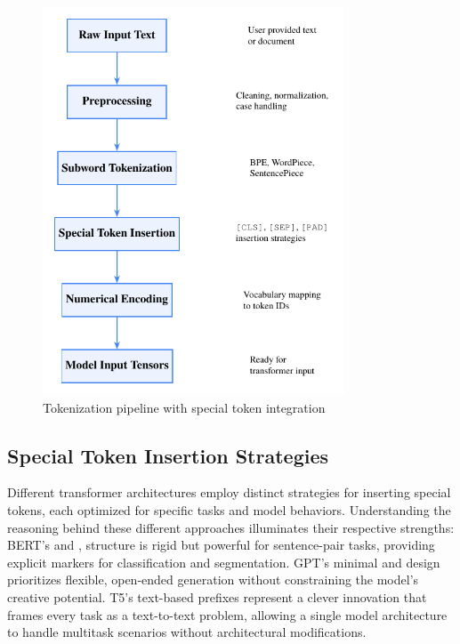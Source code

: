 \begin{figure}[htbp]
\centering
\includegraphics[width=0.8\textwidth]{part1/chapter01/fig_tokenization_pipeline.pdf}
\caption{Tokenization pipeline with special token integration}
\end{figure}

\subsection{Special Token Insertion Strategies}

Different transformer architectures employ distinct strategies for inserting special tokens, each optimized for specific tasks and model behaviors. Understanding the reasoning behind these different approaches illuminates their respective strengths: BERT's \cls{} and \sep{} structure is rigid but powerful for sentence-pair tasks, providing explicit markers for classification and segmentation. GPT's minimal \sos{} and \eos{} design prioritizes flexible, open-ended generation without constraining the model's creative potential. T5's text-based prefixes represent a clever innovation that frames every task as a text-to-text problem, allowing a single model architecture to handle multitask scenarios without architectural modifications.

